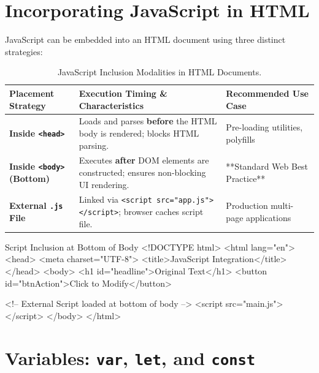 \section{Incorporating JavaScript in HTML}

JavaScript can be embedded into an HTML document using three distinct strategies:

\begin{table}[htbp]
\centering
\small
\renewcommand{\arraystretch}{1.3}
\begin{tabularx}{\linewidth}{l>{\raggedright\arraybackslash}Xl}
\toprule
\textbf{Placement Strategy} & \textbf{Execution Timing \& Characteristics} & \textbf{Recommended Use Case} \\
\midrule
\textbf{Inside \texttt{<head>}} & Loads and parses \textbf{before} the HTML body is rendered; blocks HTML parsing. & Pre-loading utilities, polyfills \\
\textbf{Inside \texttt{<body>} (Bottom)} & Executes \textbf{after} DOM elements are constructed; ensures non-blocking UI rendering. & **Standard Web Best Practice** \\
\textbf{External \texttt{.js} File} & Linked via \texttt{<script src="app.js"></script>}; browser caches script file. & Production multi-page applications \\
\bottomrule
\end{tabularx}
\caption{JavaScript Inclusion Modalities in HTML Documents.}
\label{tab:js-placement}
\end{table}

\begin{htmlcode}{Script Inclusion at Bottom of Body}
<!DOCTYPE html>
<html lang="en">
<head>
    <meta charset="UTF-8">
    <title>JavaScript Integration</title>
</head>
<body>
    <h1 id="headline">Original Text</h1>
    <button id="btnAction">Click to Modify</button>

    <!-- External Script loaded at bottom of body -->
    <script src="main.js"></script>
</body>
</html>
\end{htmlcode}

\section{Variables: \texttt{var}, \texttt{let}, and \texttt{const}}

